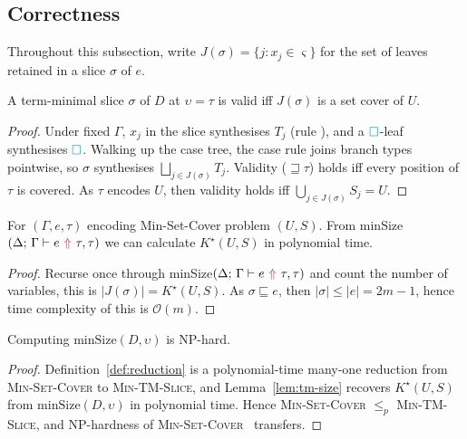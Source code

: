 \subsection{\no Correctness}\label{sec:complexity-correctness}

Throughout this subsection, write $J(\sigma) = \{j : x_j \in \varsigma\}$ for the set of leaves retained in a slice $\sigma$ of $e$.

\begin{lemma}\label{lem:tm-validity}
A term-minimal slice $\sigma$ of $D$ at $\upsilon = \tau$ is valid iff $J(\sigma)$ is a set cover of $U$.
\end{lemma}

\begin{proof}
Under fixed $\Gamma$, $x_j$ in the slice synthesises $T_j$ (rule ), and a ${\color{teal}\Box}$-leaf synthesises ${\color{teal}\Box}$. Walking up the case tree, the case rule joins branch types pointwise, so $\sigma$ synthesises $\bigsqcup_{j \in J(\sigma)} T_j$. Validity ($\sqsupseteq \tau$) holds iff every position of $\tau$ is covered. As $\tau$ encodes $U$, then validity holds iff $\bigcup_{j \in J(\sigma)} S_j = U$.
\end{proof}

\begin{lemma}\label{lem:tm-size}
For $(\Gamma, e, \tau)$ encoding Min-Set-Cover problem $(U, S)$. From minSize$(\synthesis{e}{\tau}, \tau)$ we can calculate $K^{\star}(U, S)$ in polynomial time.
\end{lemma}

\begin{proof}
Recurse once through minSize$(\synthesis{e}{\tau}, \tau)$ and count the number of variables, this is $|J(\sigma)| = K^{\star}(U,S)$. As $\sigma \sqsubseteq e$, then $|\sigma| \leq |e| = 2m - 1$, hence time complexity of this is $\mathcal{O}(m)$.
\end{proof}

\begin{majortheorembox}
\begin{theorem}\label{thm:tm-min-nph}
Computing $\mathrm{minSize}(D, \upsilon)$ is NP-hard.
\end{theorem}
\end{majortheorembox}

\begin{proof}
Definition~\ref{def:reduction} is a polynomial-time many-one reduction from \textsc{Min-Set-Cover} to \textsc{Min-TM-Slice}, and Lemma~\ref{lem:tm-size} recovers $K^\star(U, S)$ from $\mathrm{minSize}(D, \upsilon)$ in polynomial time. Hence \textsc{Min-Set-Cover} $\le_p$ \textsc{Min-TM-Slice}, and NP-hardness of \textsc{Min-Set-Cover}~\cite[\S16.1, p.~414]{KorteVygen} transfers.
\end{proof}

